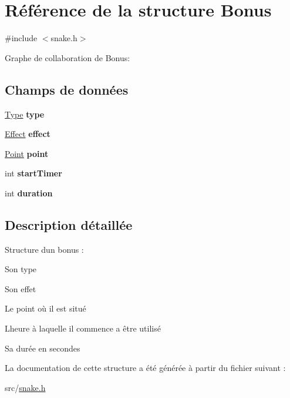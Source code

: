 \hypertarget{struct_bonus}{}\section{Référence de la structure Bonus}
\label{struct_bonus}


{\ttfamily \#include $<$snake.\+h$>$}



Graphe de collaboration de Bonus\+:
\subsection*{Champs de données}
\begin{DoxyCompactItemize}
\item 
\hyperlink{snake_8h_a1d1cfd8ffb84e947f82999c682b666a7}{Type} {\bfseries type}\hypertarget{struct_bonus_ab6f4e6d3fde00ce906e46494f60dfe7a}{}\label{struct_bonus_ab6f4e6d3fde00ce906e46494f60dfe7a}

\item 
\hyperlink{snake_8h_acd9c2a1cf576f0fd9da232d337d9720c}{Effect} {\bfseries effect}\hypertarget{struct_bonus_ab5e7dc19af149a6a7d49aa6d732e5e41}{}\label{struct_bonus_ab5e7dc19af149a6a7d49aa6d732e5e41}

\item 
\hyperlink{struct_point}{Point} {\bfseries point}\hypertarget{struct_bonus_afa95e3c7f6220a97484f80f2726b5eb5}{}\label{struct_bonus_afa95e3c7f6220a97484f80f2726b5eb5}

\item 
int {\bfseries start\+Timer}\hypertarget{struct_bonus_aa13eab873d3b9ddb6e6b5e1fdade1a0b}{}\label{struct_bonus_aa13eab873d3b9ddb6e6b5e1fdade1a0b}

\item 
int {\bfseries duration}\hypertarget{struct_bonus_ac6e4b2a3cf932b33832d4e4e4e7cd0de}{}\label{struct_bonus_ac6e4b2a3cf932b33832d4e4e4e7cd0de}

\end{DoxyCompactItemize}


\subsection{Description détaillée}
Structure d\textquotesingle{}un bonus \+:
\begin{DoxyItemize}
\item Son type
\item Son effet
\item Le point où il est situé
\item L\textquotesingle{}heure à laquelle il commence a être utilisé
\item Sa durée en secondes 
\end{DoxyItemize}

La documentation de cette structure a été générée à partir du fichier suivant \+:\begin{DoxyCompactItemize}
\item 
src/\hyperlink{snake_8h}{snake.\+h}\end{DoxyCompactItemize}
